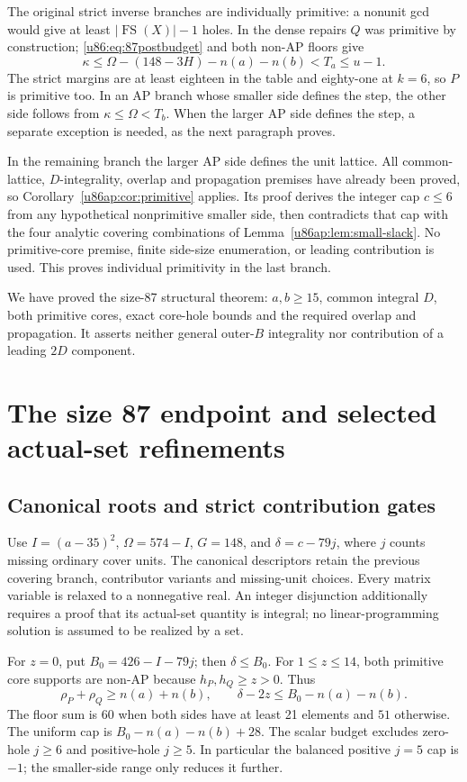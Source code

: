 \documentclass[11pt,a4paper]{article}
\theoremstyle{remark}
\newcommand{\FS}{\operatorname{FS}}
\begin{document}
The original strict inverse branches are individually primitive:
a nonunit gcd would give at least $|\FS(X)|-1$ holes. In the dense
repairs $Q$ was primitive by construction; \eqref{u86:eq:87postbudget}
and both non-AP floors give
\[
 \kappa\le\Omega-(148-3H)-n(a)-n(b)<T_a\le u-1.
\]
The strict margins are at least eighteen in the table and eighty-one
at $k=6$, so $P$ is primitive too. In an AP branch whose smaller side
defines the step, the other side follows from $\kappa\le\Omega<T_b$.
When the larger AP side defines the step, a separate exception is
needed, as the next paragraph proves.

In the remaining branch the larger AP side defines the unit lattice.
All common-lattice, $D$-integrality, overlap and propagation premises have
already been proved, so Corollary~\ref{u86ap:cor:primitive} applies.
Its proof derives the integer cap $c\le6$ from any hypothetical
nonprimitive smaller side, then contradicts that cap with the four
analytic covering combinations of Lemma~\ref{u86ap:lem:small-slack}.
No primitive-core premise, finite side-size enumeration, or leading
contribution is used. This proves individual primitivity in the last branch.

We have proved the size-87 structural theorem: $a,b\ge15$, common
integral $D$, both primitive cores, exact core-hole bounds and the
required overlap and propagation. It asserts neither general outer-$B$
integrality nor contribution of a leading $2D$ component.

\section{The size 87 endpoint and selected actual-set refinements}\label{u86:sec:upper86}


\subsection{Canonical roots and strict contribution gates}
Use $I=(a-35)^2$, $\Omega=574-I$, $G=148$, and
$\delta=c-79j$, where $j$ counts missing ordinary cover units. The
canonical descriptors retain the previous covering branch, contributor
variants and missing-unit choices. Every matrix variable is relaxed to a nonnegative real. An integer
disjunction additionally requires a proof that its actual-set quantity
is integral; no linear-programming solution is assumed to be realized
by a set.

For $z=0$, put $B_0=426-I-79j$; then $\delta\le B_0$.
For $1\le z\le14$, both primitive core supports are non-AP because
$h_P,h_Q\ge z>0$. Thus
\[
 \rho_P+\rho_Q\ge n(a)+n(b),\qquad
 \delta-2z\le B_0-n(a)-n(b).
\]
The floor sum is $60$ when both sides have at least 21 elements and
$51$ otherwise. The uniform cap is $B_0-n(a)-n(b)+28$.
The scalar budget excludes zero-hole $j\ge6$ and positive-hole
$j\ge5$. In particular the balanced positive $j=5$ cap is $-1$;
the smaller-side range only reduces it further.
\end{document}
